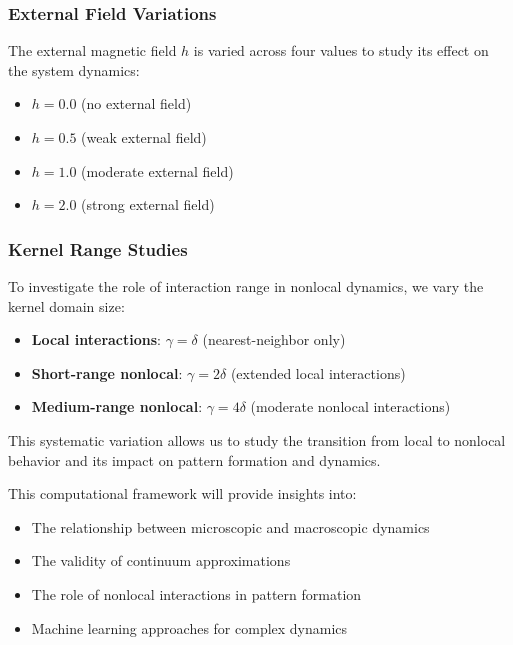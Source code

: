 \documentclass[11pt,a4paper]{article}
\begin{document}
\subsubsection{External Field Variations}

The external magnetic field $h$ is varied across four values to study its effect on the system dynamics:

\begin{itemize}
    \item $h = 0.0$ (no external field)
    \item $h = 0.5$ (weak external field)
    \item $h = 1.0$ (moderate external field)
    \item $h = 2.0$ (strong external field)
\end{itemize}

\subsubsection{Kernel Range Studies}

To investigate the role of interaction range in nonlocal dynamics, we vary the kernel domain size:

\begin{itemize}
    \item \textbf{Local interactions}: $\gamma = \delta$ (nearest-neighbor only)
    \item \textbf{Short-range nonlocal}: $\gamma = 2\delta$ (extended local interactions)
    \item \textbf{Medium-range nonlocal}: $\gamma = 4\delta$ (moderate nonlocal interactions)
\end{itemize}

This systematic variation allows us to study the transition from local to nonlocal behavior and its impact on pattern formation and dynamics.

This computational framework will provide insights into:

\begin{itemize}
    \item The relationship between microscopic and macroscopic dynamics
    \item The validity of continuum approximations
    \item The role of nonlocal interactions in pattern formation
    \item Machine learning approaches for complex dynamics
\end{itemize}
\end{document}
